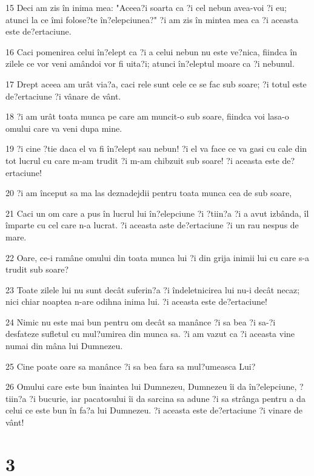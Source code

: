 \par 15 Deci am zis în inima mea: "Aceea?i soarta ca ?i cel nebun avea-voi ?i eu; atunci la ce îmi folose?te în?elepciunea?" ?i am zis în mintea mea ca ?i aceasta este de?ertaciune.
\par 16 Caci pomenirea celui în?elept ca ?i a celui nebun nu este ve?nica, fiindca în zilele ce vor veni amândoi vor fi uita?i; atunci în?eleptul moare ca ?i nebunul.
\par 17 Drept aceea am urât via?a, caci rele sunt cele ce se fac sub soare; ?i totul este de?ertaciune ?i vânare de vânt.
\par 18 ?i am urât toata munca pe care am muncit-o sub soare, fiindca voi lasa-o omului care va veni dupa mine.
\par 19 ?i cine ?tie daca el va fi în?elept sau nebun! ?i el va face ce va gasi cu cale din tot lucrul cu care m-am trudit ?i m-am chibzuit sub soare! ?i aceasta este de?ertaciune!
\par 20 ?i am început sa ma las deznadejdii pentru toata munca cea de sub soare,
\par 21 Caci un om care a pus în lucrul lui în?elepciune ?i ?tiin?a ?i a avut izbânda, îl împarte cu cel care n-a lucrat. ?i aceasta aste de?ertaciune ?i un rau nespus de mare.
\par 22 Oare, ce-i ramâne omului din toata munca lui ?i din grija inimii lui cu care s-a trudit sub soare?
\par 23 Toate zilele lui nu sunt decât suferin?a ?i îndeletnicirea lui nu-i decât necaz; nici chiar noaptea n-are odihna inima lui. ?i aceasta este de?ertaciune!
\par 24 Nimic nu este mai bun pentru om decât sa manânce ?i sa bea ?i sa-?i desfateze sufletul cu mul?umirea din munca sa. ?i am vazut ca ?i aceasta vine numai din mâna lui Dumnezeu.
\par 25 Cine poate oare sa manânce ?i sa bea fara sa mul?umeasca Lui?
\par 26 Omului care este bun înaintea lui Dumnezeu, Dumnezeu îi da în?elepciune, ?tiin?a ?i bucurie, iar pacatosului îi da sarcina sa adune ?i sa strânga pentru a da celui ce este bun în fa?a lui Dumnezeu. ?i aceasta este de?ertaciune ?i vinare de vânt!

\chapter{3}


